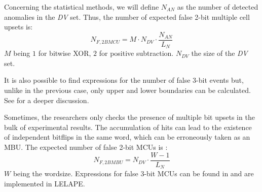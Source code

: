 Concerning the statistical methods, we will define \(N_{AN}\) as the number of detected anomalies in the \textit{DV} set. Thus, the number of expected false 2-bit multiple cell upsets is:
%
\begin{equation}
	N_{F,2BMCU} = M\cdot N_{DV}\cdot \frac{N_{AN}}{L_N}
	\label{Eq;False2bitMCU}
\end{equation}
%
\(M\) being \(1\) for bitwise XOR, \(2\) for positive subtraction. \(N_{DV}\) the size of the \textit{DV} set.

It is also possible to find expressions for the number of false 3-bit events but, unlike in the previous case, only upper and lower boundaries can be calculated. See \cite{Franco2020} for a deeper discussion. 

Sometimes, the researchers only checks the presence of multiple bit upsets in the bulk of experimental results. The accumulation of hits can lead to the existence of independent bitflips in the same word, which can be erroneously taken  as an MBU. The expected number of false 2-bit MCUs is \cite{Franco2020}:
%
\begin{equation}
	N_{F,2BMBU} = N_{DV}\cdot \frac{W-1}{L_N}
	\label{Eq:False2bitMBU}
\end{equation} 
%
\(W\) being the wordsize. Expressions for false 3-bit MCUs can be found in \cite{Franco2020} and are implemented in LELAPE.